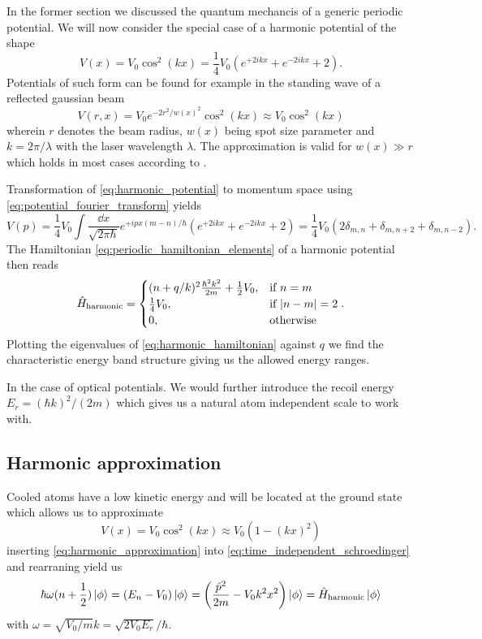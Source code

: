 In the former section we discussed the quantum mechancis of a generic
periodic potential. We will now consider the special case of a harmonic
potential of the shape
\begin{equation}
  V(x)
  =V_0\cos^2(kx)
  =\frac{1}{4}V_0\left(e^{+2ikx}+e^{-2ikx}+2\right)
  \label{eq:harmonic_potential}.
\end{equation}
Potentials of such form can be found for example in the standing wave of a
reflected gaussian beam
\begin{equation}
  V(r,x)
  =V_0e^{-2r^2/w(x)^2}\cos^2(kx)
  \approx V_0\cos^2(kx)
  \label{eq:optical_potential}
\end{equation}
wherein $r$ denotes the beam radius, $w(x)$ being spot size parameter and
$k=2\pi/\lambda$ with the laser wavelength $\lambda$. The approximation is
valid for $w(x)\gg r$ which holds in most cases according to
\cite[p.127]{Rom2009}.

Transformation of \cref{eq:harmonic_potential} to momentum space
using \cref{eq:potential_fourier_transform} yields
\begin{equation*}
  V(p)
  =
  \frac{1}{4}V_0
  \int\frac{\dd{x}}{\sqrt{2\pi\hbar}}
  e^{+ipx(m-n)/\hbar}\left(e^{+2ikx}+e^{-2ikx}+2\right)
  =
  \frac{1}{4}V_0\left(2\delta_{m,n}+\delta_{m,n+2}+\delta_{m,n-2}\right).
\end{equation*}
The Hamiltonian \cref{eq:periodic_hamiltonian_elements} of a
harmonic potential then reads
\begin{equation}
  \hat{H}_\text{harmonic}
  =\begin{cases}
    (n+q/k)^2\frac{\hbar^2k^2}{2m}+\frac{1}{2}V_0, & \text{if } n=m\\
    \frac{1}{4}V_0, & \text{if } \abs{n-m}=2\\
    0, & \text{otherwise}
  \end{cases}
  \label{eq:harmonic_hamiltonian}.
\end{equation}
Plotting the eigenvalues of \cref{eq:harmonic_hamiltonian} against
$q$ we find the characteristic energy band structure giving us the allowed
energy ranges.

In the case of optical potentials. We would further introduce the recoil
energy $E_r=(\hbar k)^2/(2m)$ which gives us a natural atom independent scale
to work with.

\subsection{Harmonic approximation}

Cooled atoms have a low kinetic energy and will be located at the ground
state which allows us to approximate
\begin{equation}
  V(x)
  =V_0\cos^2(kx)
  \approx V_0\left(1-(kx)^2\right)
  \label{eq:harmonic_approximation}
\end{equation}
inserting \cref{eq:harmonic_approximation} into
\cref{eq:time_independent_schroedinger} and rearraning yield us
\begin{equation}
  \hbar\omega(n+\frac{1}{2})\ket{\phi}
  =(E_n-V_0)\ket{\phi}
  =\left(\frac{\hat{p}^2}{2m}-V_0k^2x^2\right)\ket{\phi}
  =\hat{H}_\text{harmonic}\ket{\phi}
\end{equation}
with $\omega=\sqrt{V_0/m}k=\sqrt{2V_0E_r}/\hbar$.
